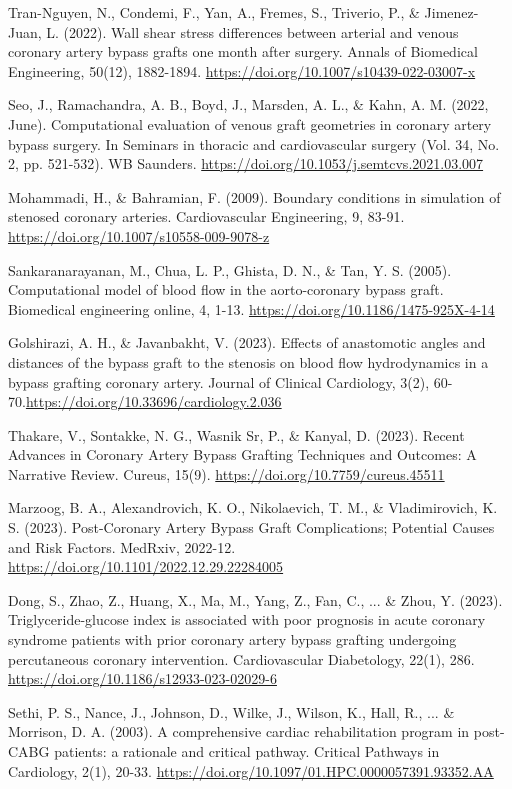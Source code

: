 ﻿\documentclass[12pt,a4paper]{article}
\theoremstyle{definition}
\numberwithin{equation}{section}
\begin{document}
\begin{thebibliography}{}
 Tran-Nguyen, N., Condemi, F., Yan, A., Fremes, S., Triverio, P., \& Jimenez-Juan, L. (2022). Wall shear stress differences between arterial and venous coronary artery bypass grafts one month after surgery. Annals of Biomedical Engineering, 50(12), 1882-1894. \url{https://doi.org/10.1007/s10439-022-03007-x}

 Seo, J., Ramachandra, A. B., Boyd, J., Marsden, A. L., \& Kahn, A. M. (2022, June). Computational evaluation of venous graft geometries in coronary artery bypass surgery. In Seminars in thoracic and cardiovascular surgery (Vol. 34, No. 2, pp. 521-532). WB Saunders. \url{https://doi.org/10.1053/j.semtcvs.2021.03.007}

 Mohammadi, H., \& Bahramian, F. (2009). Boundary conditions in simulation of stenosed coronary arteries. Cardiovascular Engineering, 9, 83-91. \url{https://doi.org/10.1007/s10558-009-9078-z}

 Sankaranarayanan, M., Chua, L. P., Ghista, D. N., \& Tan, Y. S. (2005). Computational model of blood flow in the aorto-coronary bypass graft. Biomedical engineering online, 4, 1-13. \url{https://doi.org/10.1186/1475-925X-4-14}

 Golshirazi, A. H., \& Javanbakht, V. (2023). Effects of anastomotic angles and distances of the bypass graft to the stenosis on blood flow hydrodynamics in a bypass grafting coronary artery. Journal of Clinical Cardiology, 3(2), 60-70.\url{https://doi.org/10.33696/cardiology.2.036}

 Thakare, V., Sontakke, N. G., Wasnik Sr, P., \& Kanyal, D. (2023). Recent Advances in Coronary Artery Bypass Grafting Techniques and Outcomes: A Narrative Review. Cureus, 15(9). \url{https://doi.org/10.7759/cureus.45511}

 Marzoog, B. A., Alexandrovich, K. O., Nikolaevich, T. M., \& Vladimirovich, K. S. (2023). Post-Coronary Artery Bypass Graft Complications; Potential Causes and Risk Factors. MedRxiv, 2022-12. \url{https://doi.org/10.1101/2022.12.29.22284005}

 Dong, S., Zhao, Z., Huang, X., Ma, M., Yang, Z., Fan, C., ... \& Zhou, Y. (2023). Triglyceride-glucose index is associated with poor prognosis in acute coronary syndrome patients with prior coronary artery bypass grafting undergoing percutaneous coronary intervention. Cardiovascular Diabetology, 22(1), 286. \url{https://doi.org/10.1186/s12933-023-02029-6}

 Sethi, P. S., Nance, J., Johnson, D., Wilke, J., Wilson, K., Hall, R., ... \& Morrison, D. A. (2003). A comprehensive cardiac rehabilitation program in post-CABG patients: a rationale and critical pathway. Critical Pathways in Cardiology, 2(1), 20-33. \url{https://doi.org/10.1097/01.HPC.0000057391.93352.AA}


\end{thebibliography}
\end{document}
